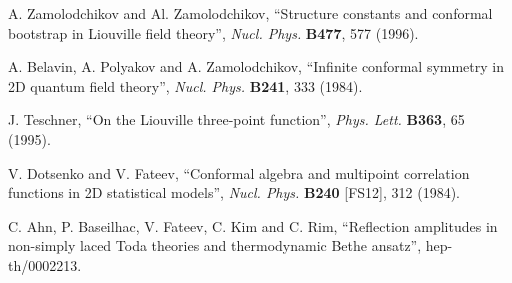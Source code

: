 \documentclass[a4paper,12pt]{article}
\begin{document}
\begin{thebibliography}{10}
%
 A. Zamolodchikov and Al. Zamolodchikov, ``Structure constants 
and conformal bootstrap in Liouville field theory'', {\it Nucl. Phys.}
{\bf B477}, 577 (1996).

%
 A. Belavin, A. Polyakov and A. Zamolodchikov, ``Infinite
conformal symmetry in 2D quantum field theory'', {\it Nucl. Phys.}
{\bf B241}, 333 (1984).

%
 J. Teschner, ``On the Liouville three-point function'',
{\it Phys. Lett.} {\bf B363}, 65 (1995).

%
 V. Dotsenko and V. Fateev, ``Conformal algebra and multipoint
correlation functions in 2D statistical models'', {\it Nucl. Phys.}
{\bf B240} [FS12], 312 (1984).

%
 C. Ahn, P. Baseilhac, V. Fateev, C. Kim and C. Rim,
``Reflection amplitudes in non-simply laced Toda theories and
thermodynamic Bethe ansatz'', hep-th/0002213.

\end{thebibliography}
\end{document}
